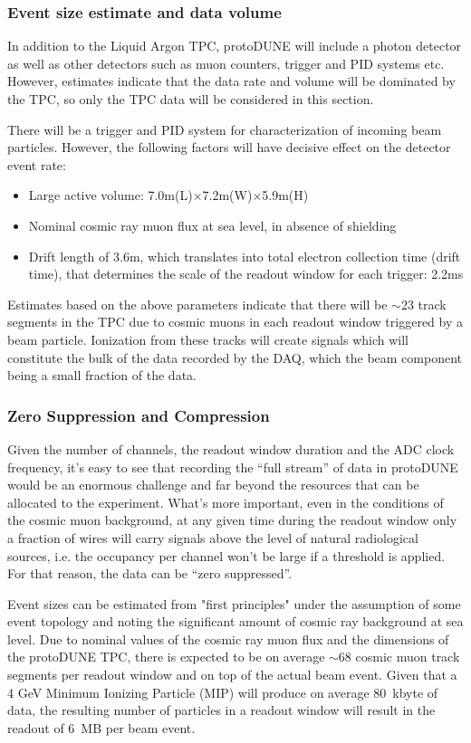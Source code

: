 \subsubsection{Event size estimate and data volume}
In addition to the Liquid Argon TPC, protoDUNE will include a photon detector as well as other detectors such as muon counters, trigger and PID systems etc.
However, estimates indicate that the data rate and volume will be dominated by the TPC, so only the TPC data will be considered in this section.


There will be a trigger and PID system for characterization of incoming beam particles. However, the following factors will have decisive effect on the detector event rate:
\begin{itemize}
\item Large active volume: 7.0m(L)$\times$7.2m(W)$\times$5.9m(H)
\item Nominal cosmic ray muon flux at sea level, in absence of shielding
\item Drift length of 3.6m, which translates into total electron collection time (drift time), that  determines the scale of the readout window for each trigger: 2.2ms
\end{itemize}

Estimates based on the above parameters indicate that there will be $\sim$23 track segments in the TPC due to cosmic muons in each readout window
triggered by a beam particle. Ionization from these tracks will create signals which will constitute the bulk of the data recorded by the DAQ, which the beam
component being a small fraction of the data.

\subsubsection{Zero Suppression and Compression}
Given the number of channels, the readout window duration and the ADC clock frequency, it's easy to see that recording the ``full stream'' of data
in protoDUNE would be an enormous challenge and far beyond the resources that can be allocated to the experiment. What's more important,
even in the conditions of the cosmic muon background, at any given time during the readout window only a fraction of wires will carry signals
above the level of natural radiological sources, i.e. the occupancy per channel won't be large if a threshold is applied. For that reason, the data can be ``zero suppressed''.

Event sizes can be estimated from "first principles" under the assumption of some event topology
and noting the significant amount of cosmic ray background at sea level.
Due to nominal values of the cosmic ray muon flux and the dimensions of the protoDUNE TPC,
there is expected to be on average $\sim$68 cosmic muon track segments per readout window and on top of the actual beam event.
Given that a 4 GeV Minimum Ionizing Particle (MIP) will produce on average 80~kbyte of data, the resulting number of particles in
a readout window will result in the readout of 6~MB per beam event. 

